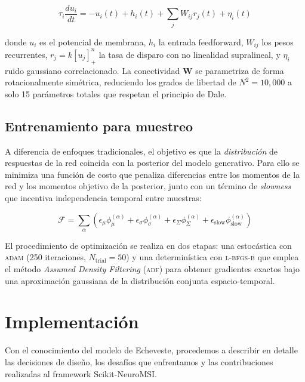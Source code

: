 \documentclass{llncs}
\begin{document}
\begin{equation}
\tau_i \frac{du_i}{dt} = -u_i(t) + h_i(t) + \sum_j W_{ij} r_j(t) +
\eta_i(t)
\label{eq:ssn}
\end{equation}

donde $u_i$ es el potencial de membrana, $h_i$ la entrada
feedforward, $W_{ij}$ los pesos recurrentes, $r_j = k[u_j]_+^n$ la
tasa de disparo con no linealidad supralineal, y $\eta_i$ ruido
gaussiano correlacionado. La conectividad $\mathbf{W}$ se parametriza
de forma rotacionalmente simétrica, reduciendo los grados de libertad
de $N^2 = 10{,}000$ a solo 15 parámetros totales que respetan el
principio de Dale.

\subsection{Entrenamiento para muestreo}

A diferencia de enfoques tradicionales, el objetivo es que la
\emph{distribución} de respuestas de la red coincida con la posterior
del modelo generativo. Para ello se minimiza una función de costo que
penaliza diferencias entre los momentos de la red y los momentos
objetivo de la posterior, junto con un término de \emph{slowness} que
incentiva independencia temporal entre muestras:

\begin{equation}
\mathcal{F} = \sum_\alpha \left( \epsilon_{\mu} \phi_{\mu}^{(\alpha)}
+ \epsilon_{\sigma} \phi_{\sigma}^{(\alpha)} + \epsilon_{\Sigma}
\phi_{\Sigma}^{(\alpha)} + \epsilon_{\text{slow}}
\phi_{\text{slow}}^{(\alpha)} \right)
\label{eq:costo}
\end{equation}

El procedimiento de optimización se realiza en dos etapas: una
estocástica con \textsc{adam} (250 iteraciones, $N_{\text{trial}} =
50$) y una determinística con \textsc{l-bfgs-b} que emplea el método
\emph{Assumed Density Filtering} (\textsc{adf}) para obtener
gradientes exactos bajo una aproximación gaussiana de la distribución
conjunta espacio-temporal.

\section{Implementación}

Con el conocimiento del modelo de Echeveste, procedemos a describir
en detalle las decisiones de diseño, los desafíos que enfrentamos y
las contribuciones realizadas al framework Scikit-NeuroMSI.
\end{document}
